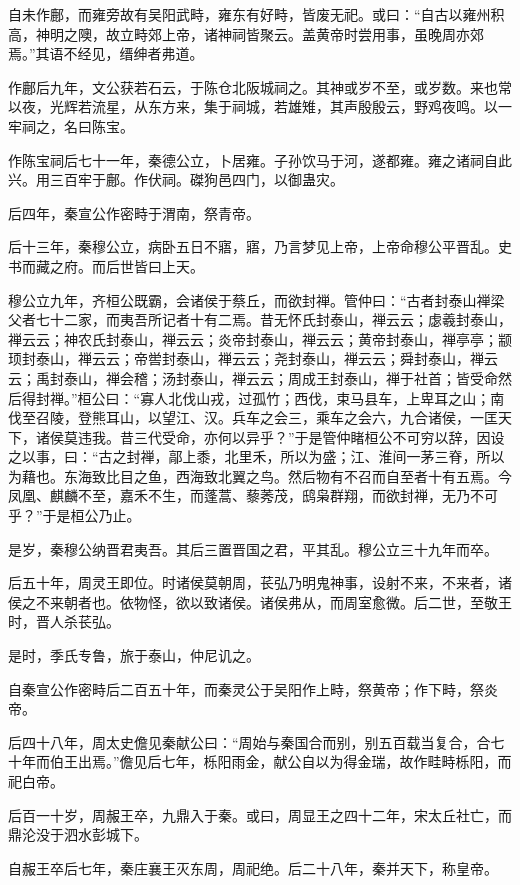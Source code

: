 \documentclass[]{article}
\begin{document}
自未作鄜，而雍旁故有吴阳武畤，雍东有好畤，皆废无祀。或曰：``自古以雍州积高，神明之隩，故立畤郊上帝，诸神祠皆聚云。盖黄帝时尝用事，虽晚周亦郊焉。''其语不经见，缙绅者弗道。

作鄜后九年，文公获若石云，于陈仓北阪城祠之。其神或岁不至，或岁数。来也常以夜，光辉若流星，从东方来，集于祠城，若雄雉，其声殷殷云，野鸡夜鸣。以一牢祠之，名曰陈宝。

作陈宝祠后七十一年，秦德公立，卜居雍。子孙饮马于河，遂都雍。雍之诸祠自此兴。用三百牢于鄜。作伏祠。磔狗邑四门，以御蛊灾。

后四年，秦宣公作密畤于渭南，祭青帝。

后十三年，秦穆公立，病卧五日不寤，寤，乃言梦见上帝，上帝命穆公平晋乱。史书而藏之府。而后世皆曰上天。

穆公立九年，齐桓公既霸，会诸侯于蔡丘，而欲封禅。管仲曰：``古者封泰山禅梁父者七十二家，而夷吾所记者十有二焉。昔无怀氏封泰山，禅云云；虙羲封泰山，禅云云；神农氏封泰山，禅云云；炎帝封泰山，禅云云；黄帝封泰山，禅亭亭；颛顼封泰山，禅云云；帝喾封泰山，禅云云；尧封泰山，禅云云；舜封泰山，禅云云；禹封泰山，禅会稽；汤封泰山，禅云云；周成王封泰山，禅于社首；皆受命然后得封禅。''桓公曰：``寡人北伐山戎，过孤竹；西伐，束马县车，上卑耳之山；南伐至召陵，登熊耳山，以望江、汉。兵车之会三，乘车之会六，九合诸侯，一匡天下，诸侯莫违我。昔三代受命，亦何以异乎？''于是管仲睹桓公不可穷以辞，因设之以事，曰：``古之封禅，鄗上黍，北里禾，所以为盛；江、淮间一茅三脊，所以为藉也。东海致比目之鱼，西海致北翼之鸟。然后物有不召而自至者十有五焉。今凤凰、麒麟不至，嘉禾不生，而蓬蒿、藜莠茂，鸱枭群翔，而欲封禅，无乃不可乎？''于是桓公乃止。

是岁，秦穆公纳晋君夷吾。其后三置晋国之君，平其乱。穆公立三十九年而卒。

后五十年，周灵王即位。时诸侯莫朝周，苌弘乃明鬼神事，设射不来，不来者，诸侯之不来朝者也。依物怪，欲以致诸侯。诸侯弗从，而周室愈微。后二世，至敬王时，晋人杀苌弘。

是时，季氏专鲁，旅于泰山，仲尼讥之。

自秦宣公作密畤后二百五十年，而秦灵公于吴阳作上畤，祭黄帝；作下畤，祭炎帝。

后四十八年，周太史儋见秦献公曰：``周始与秦国合而别，别五百载当复合，合七十年而伯王出焉。''儋见后七年，栎阳雨金，献公自以为得金瑞，故作畦畤栎阳，而祀白帝。

后百一十岁，周赧王卒，九鼎入于秦。或曰，周显王之四十二年，宋太丘社亡，而鼎沦没于泗水彭城下。

自赧王卒后七年，秦庄襄王灭东周，周祀绝。后二十八年，秦并天下，称皇帝。
\end{document}
